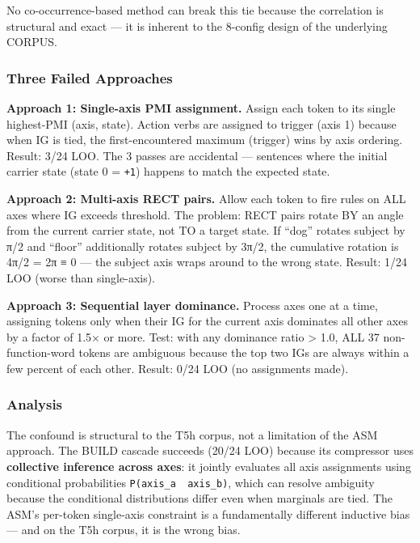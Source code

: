 \documentclass[
  twocolumn,
  10pt,
  a4paper]{article}
\begin{document}
No co-occurrence-based method can break this tie because the correlation
is structural and exact --- it is inherent to the 8-config design of the
underlying CORPUS.

\hypertarget{three-failed-approaches}{%
\subsubsection{Three Failed Approaches}\label{three-failed-approaches}}

\textbf{Approach 1: Single-axis PMI assignment.} Assign each token to
its single highest-PMI (axis, state). Action verbs are assigned to
trigger (axis 1) because when IG is tied, the first-encountered maximum
(trigger) wins by axis ordering. Result: 3/24 LOO. The 3 passes are
accidental --- sentences where the initial carrier state (state 0 =
\texttt{\textquotesingle{}+1\textquotesingle{}}) happens to match the
expected state.

\textbf{Approach 2: Multi-axis RECT pairs.} Allow each token to fire
rules on ALL axes where IG exceeds threshold. The problem: RECT pairs
rotate BY an angle from the current carrier state, not TO a target
state. If ``dog'' rotates subject by π/2 and ``floor'' additionally
rotates subject by 3π/2, the cumulative rotation is 4π/2 = 2π ≡ 0 ---
the subject axis wraps around to the wrong state. Result: 1/24 LOO
(worse than single-axis).

\textbf{Approach 3: Sequential layer dominance.} Process axes one at a
time, assigning tokens only when their IG for the current axis dominates
all other axes by a factor of 1.5× or more. Test: with any dominance
ratio \textgreater{} 1.0, ALL 37 non-function-word tokens are ambiguous
because the top two IGs are always within a few percent of each other.
Result: 0/24 LOO (no assignments made).

\hypertarget{analysis}{%
\subsubsection{Analysis}\label{analysis}}

The confound is structural to the T5h corpus, not a limitation of the
ASM approach. The BUILD cascade succeeds (20/24 LOO) because its
compressor uses \textbf{collective inference across axes}: it jointly
evaluates all axis assignments using conditional probabilities
\texttt{P(axis\_a\ \textbar{}\ axis\_b)}, which can resolve ambiguity
because the conditional distributions differ even when marginals are
tied. The ASM's per-token single-axis constraint is a fundamentally
different inductive bias --- and on the T5h corpus, it is the wrong
bias.
\end{document}
